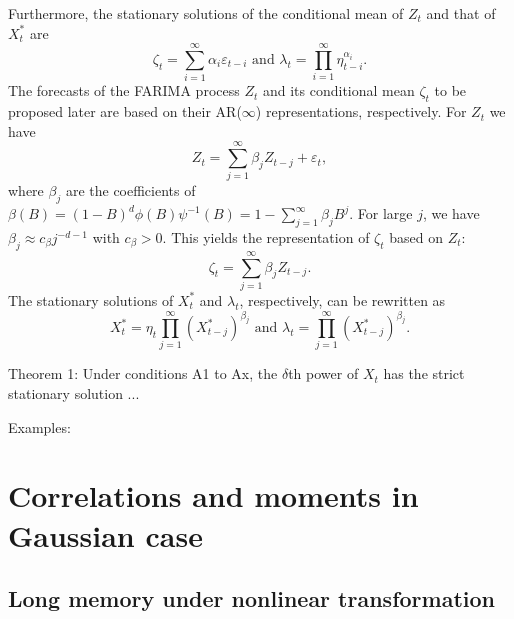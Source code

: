 \documentclass[12pt]{article}
\begin{document}
Furthermore, the stationary solutions of the conditional mean of $Z_t$ and that of $X_t^*$ are
\begin{equation}
\zeta_t=\sum_{i=1}^\infty \alpha_i\varepsilon_{t-i} \mbox{ and } \lambda_t=\prod\limits_{i=1}^\infty \eta_{t-i}^{\alpha_i}.
\label{Zeta}
\end{equation}
The forecasts of the FARIMA process $Z_t$ and its conditional mean $\zeta_t$ to be proposed later are based on their AR($\infty$) representations, respectively. For $Z_t$ we have
 \begin{equation}\label{ARInf}
 Z_t=\sum_{j=1}^\infty \beta_j Z_{t-j}+\varepsilon_t,
 \end{equation}
 where $\beta_j$ are the coefficients of $\beta(B)=(1-B)^d\phi(B)\psi^{-1}(B)=1-\sum_{j=1}^\infty\beta_jB^j$. For large $j$, we have $\beta_j\approx c_\beta j^{-d-1}$ with $c_\beta>0$. This yields the representation of $\zeta_t$ based on $Z_t$:
 \begin{equation}
  \zeta_t=\sum_{j=1}^\infty \beta_j Z_{t-j}.
 \end{equation}
The stationary solutions of $X_t^*$ and $\lambda_t$, respectively, can be rewritten as
 \begin{equation}
 X_t^*=\eta_t\prod_{j=1}^\infty(X_{t-j}^*)^{\beta_j} \mbox{ and }  \lambda_t=\prod_{j=1}^\infty(X_{t-j}^*)^{\beta_j}.
 \label{conditional mean lambda}
 \end{equation}



Theorem 1: Under conditions A1 to Ax,  the $\delta$th power of $X_t$ has the strict stationary solution ...

Examples: 

\section{Correlations and moments in Gaussian case}

\subsection{Long memory under nonlinear transformation}
\end{document}
